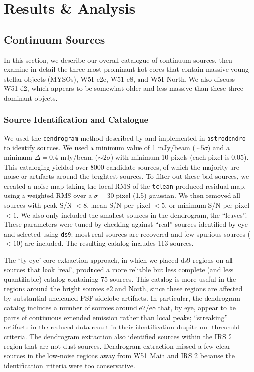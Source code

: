 \documentclass[twocolumn]{aastex61}
\begin{document}
\section{Results \& Analysis}
\label{sec:results}

\subsection{Continuum Sources}
\label{sec:contsources}
In this section, we describe our overall catalogue of continuum sources,
then examine in detail the three most prominant hot cores that contain
massive young stellar objects (MYSOs), W51 e2e, W51 e8, and W51 North.
We also discuss W51 d2, which appears to be somewhat older and less massive
than these three dominant objects.

\subsubsection{Source Identification and Catalogue}
\label{sec:sourceid}
We used the \texttt{dendrogram} method described by \citet{Rosolowsky2008c} and
implemented in \texttt{astrodendro} to identify sources.  We used a minimum
value of 1 mJy/beam ($\sim5\sigma$) and a minimum $\Delta=0.4$ mJy/beam
($\sim2\sigma$) with minimum 10 pixels (each pixel is 0.05\arcsec).  This
cataloging yielded over 8000 candidate sources, of which the majority are noise
or artifacts around the brightest sources.  To filter out these bad sources,
we created a noise map taking the local RMS of the \texttt{tclean}-produced
residual map, using a weighted RMS over a $\sigma=30$ pixel (1.5\arcsec)
gaussian.  We then removed
all sources with peak S/N $< 8$, mean S/N per pixel $< 5$, or minimum S/N per
pixel $ < 1$.  We also only included the smallest sources in the dendrogram,
the ``leaves''.  These parameters were tuned by checking against ``real''
sources identified by eye and selected using \texttt{ds9}: most real sources are
recovered and few spurious sources ($<10$) are
included.  The resulting catalog includes 113 sources.

The `by-eye' core extraction approach, in which we placed ds9 regions on all
sources that look `real', produced a more reliable but less complete (and less
quantifiable) catalog containing 75 sources.  This catalog is more useful in
the regions around the bright sources e2 and North, since these regions are
affected by substantial uncleaned PSF sidelobe artifacts.  In particular, the
dendrogram catalog includes a number of sources around e2/e8 that, by eye,
appear to be parts of continuous extended emission rather than local peaks;
``streaking'' artifacts in the reduced data result in their identification
despite our threshold criteria.  The dendrogram extraction also identified
sources within the IRS 2 \hii region that are not dust sources.  Dendrogram
extraction missed a few clear sources in the low-noise regions away from
W51 Main and IRS 2 because the identification criteria were too conservative.
\end{document}
